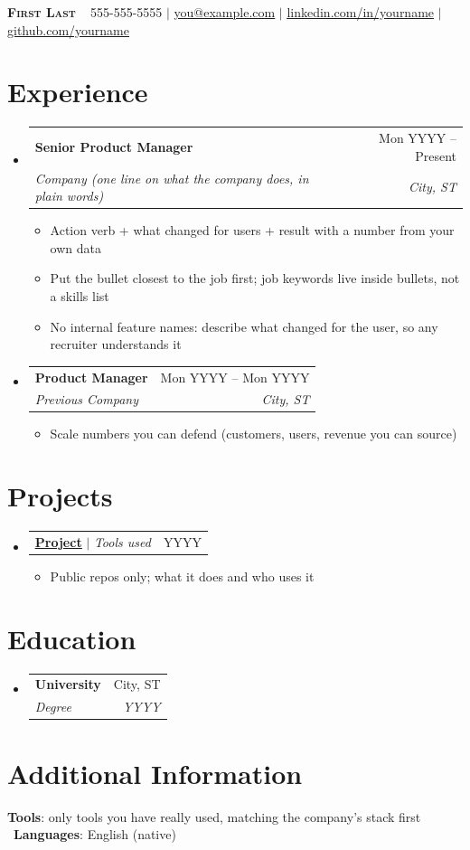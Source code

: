 \documentclass[letterpaper,11pt]{article}
\makeatletter
\newcommand{\resumeItem}[1]{
  \item\small{
    {#1 \vspace{-2pt}}
  }
}
\newcommand{\resumeSubheading}[4]{
  \vspace{-2pt}\item
    \begin{tabular*}{0.97\textwidth}[t]{l@{\extracolsep{\fill}}r}
      \textbf{#1} & #2 \\
      \textit{\small#3} & \textit{\small #4} \\
    \end{tabular*}\vspace{-7pt}
}
\newcommand{\resumeProjectHeading}[2]{
    \item
    \begin{tabular*}{0.97\textwidth}{l@{\extracolsep{\fill}}r}
      \small#1 & #2 \\
    \end{tabular*}\vspace{-7pt}
}
\newcommand{\resumeSubHeadingListStart}{\begin{itemize}[leftmargin=0.15in, label={}]}
\newcommand{\resumeSubHeadingListEnd}{\end{itemize}}
\newcommand{\resumeItemListStart}{\begin{itemize}}
\newcommand{\resumeItemListEnd}{\end{itemize}\vspace{-5pt}}
\makeatother
\begin{document}
\begin{center}
    \textbf{\Huge \scshape First Last} \ \vspace{1pt}
    \small 555-555-5555 $|$ \href{mailto:you@example.com}{\underline{you@example.com}} $|$
    \href{https://linkedin.com/in/yourname}{\underline{linkedin.com/in/yourname}} $|$
    \href{https://github.com/yourname}{\underline{github.com/yourname}}
\end{center}

\section{Experience}
  \resumeSubHeadingListStart

    \resumeSubheading
      {Senior Product Manager}{Mon YYYY -- Present}
      {Company \textit{(one line on what the company does, in plain words)}}{City, ST}
      \resumeItemListStart
        \resumeItem{Action verb + what changed for users + result with a number from your own data}
        \resumeItem{Put the bullet closest to the job first; job keywords live inside bullets, not a skills list}
        \resumeItem{No internal feature names: describe what changed for the user, so any recruiter understands it}
      \resumeItemListEnd

    \resumeSubheading
      {Product Manager}{Mon YYYY -- Mon YYYY}
      {Previous Company}{City, ST}
      \resumeItemListStart
        \resumeItem{Scale numbers you can defend (customers, users, revenue you can source)}
      \resumeItemListEnd

  \resumeSubHeadingListEnd

\section{Projects}
    \resumeSubHeadingListStart
      \resumeProjectHeading
          {\href{https://github.com/yourname/project}{\textbf{\underline{Project}}} $|$ \emph{Tools used}}{YYYY}
          \resumeItemListStart
            \resumeItem{Public repos only; what it does and who uses it}
          \resumeItemListEnd
    \resumeSubHeadingListEnd

\section{Education}
  \resumeSubHeadingListStart
    \resumeSubheading
      {University}{City, ST}
      {Degree}{YYYY}
  \resumeSubHeadingListEnd

\section{Additional Information}
 \begin{itemize}[leftmargin=0.15in, label={}]
    \small{\item{
     \textbf{Tools}{: only tools you have really used, matching the company's stack first} \
     \textbf{Languages}{: English (native)}
    }}
 \end{itemize}
\end{document}
